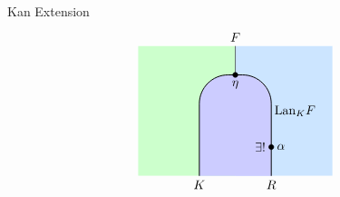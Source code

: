 \begin{definition}{Kan Extension}{}
\[\begin{tikzpicture}
        \begin{scope}[shift={(7.5,0)}]
            \begin{scope} 
                \clip (-2.7,0) rectangle (2.7, 3.6);     
                \fill[fill=leftcolor] (-3,0) rectangle (0, 4);  
                \fill[fill=rightcolor] (0,0) rectangle (3, 4);  
                \draw[fill=midcolor, rounded corners=0.8cm, line width=0.7pt] (-1, -2) rectangle (1, 2.8);
            \end{scope}
            \draw (0, 3.6) -- (0,2.8);
            \filldraw [black] (1,0.8) circle (2pt) node[right=1pt] {$\alpha$} node[left=1pt] {$\exists!$};
       
            \node[below] at (-1, 0) {$K$};
            \node[right=-1pt] at (1, 1.8) {$\mathrm{Lan}_KF$};
    
            \node[below] at (1, 0) {$R$};
            \filldraw [black] (0, 2.8) circle (2pt) node[below=1pt] {$\eta$};
        
           
            \node[above] at (0, 3.6) {$F$};
        \end{scope}
    

\end{tikzpicture}\]
\end{definition}
